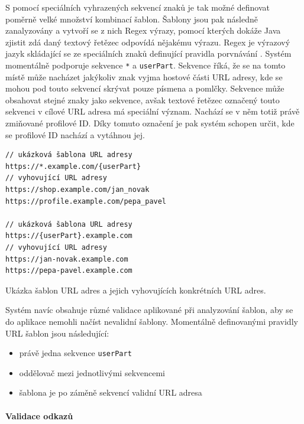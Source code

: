 \begin{itemize}
\begin{itemize}
			S pomocí speciálních vyhrazených sekvencí znaků je tak možné definovat poměrně velké množství kombinací
			šablon.
			Šablony jsou pak následně zanalyzovány a vytvoří se z nich Regex výrazy, pomocí kterých dokáže Java zjistit
			zdá daný textový řetězec odpovídá nějakému výrazu.
			Regex je výrazový jazyk skládající se ze speciálních znaků definující pravidla porvnávání \cite{regex}.
			Systém momentálně podporuje sekvence \lstinline{*} a \lstinline{userPart}.
			Sekvence \lstlisting{*} říká, že se na tomto místě může nacházet jakýkoliv znak vyjma hostové části \ac{URL}
			adresy, kde se mohou pod touto sekvencí skrývat pouze písmena a pomlčky.
			Sekvence  může obsahovat stejné znaky jako \lstlisting{*} sekvence, avšak textové
			řetězec označený touto sekvenci v cílové \ac{URL} adresa má speciální význam.
			Nachází se v něm totiž právě zmiňované profilové ID.
			Díky tomuto označení je pak systém schopen určit, kde se profilové ID nachází a vytáhnou jej.

			\begin{lstlisting}
// ukázková šablona URL adresy
https://*.example.com/{userPart}
// vyhovující URL adresy
https://shop.example.com/jan_novak
https://profile.example.com/pepa_pavel

// ukázková šablona URL adresy
https://{userPart}.example.com
// vyhovující URL adresy
https://jan-novak.example.com
https://pepa-pavel.example.com
			\end{lstlisting}
			Ukázka šablon URL adres a jejich vyhovujících konkrétních URL adres. %

			Systém navíc obsahuje různé validace aplikované při analyzování šablon, aby se do aplikace nemohli načíst
			nevalidní šablony.
			Momentálně definovanými pravidly URL šablon jsou následující:
			\begin{itemize}
				\item právě jedna sekvence \lstinline{userPart}
				\item oddělovač mezi jednotlivými sekvencemi
				\item šablona je po záměně sekvencí validní URL adresa
			\end{itemize}

			\paragraph{Validace odkazů}


\end{itemize}
\end{itemize}
